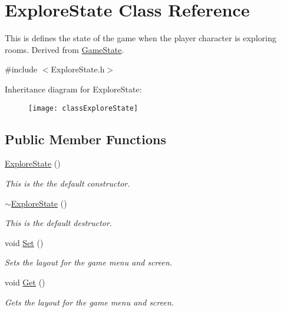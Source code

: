 \hypertarget{classExploreState}{\section{Explore\-State Class Reference}
\label{classExploreState}
}


This is defines the state of the game when the player character is exploring rooms. Derived from \hyperlink{classGameState}{Game\-State}.  




{\ttfamily \#include $<$Explore\-State.\-h$>$}

Inheritance diagram for Explore\-State\-:\begin{figure}[H]
\begin{center}
\leavevmode
\texttt{[image: classExploreState]}
\end{center}
\end{figure}
\subsection*{Public Member Functions}
\begin{DoxyCompactItemize}
\item 
\hyperlink{classExploreState_ac10ad3cee219e8233a2c279392b70d52}{Explore\-State} ()
\begin{DoxyCompactList}\small\item\em This is the the default constructor. \end{DoxyCompactList}\item 
\hyperlink{classExploreState_a713fbeb296e929346e07ffe63c1af580}{$\sim$\-Explore\-State} ()
\begin{DoxyCompactList}\small\item\em This is the default destructor. \end{DoxyCompactList}\item 
void \hyperlink{classExploreState_a8fb38f9fca513b87d914d077a0f2652b}{Set} ()
\begin{DoxyCompactList}\small\item\em Sets the layout for the game menu and screen. \end{DoxyCompactList}\item 
void \hyperlink{classExploreState_ace76d7a24bcb85f6f0a0fe0d0e763e21}{Get} ()
\begin{DoxyCompactList}\small\item\em Gets the layout for the game menu and screen. \end{DoxyCompactList}\end{DoxyCompactItemize}

